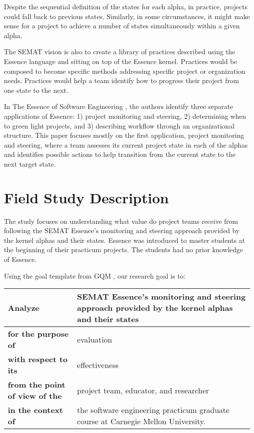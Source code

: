 Despite the sequential definition of the states for each alpha, in practice, projects could fall back to previous states. Similarly, in some circumstances, it might make sense for a project to achieve a number of states simultaneously within a given alpha.

The SEMAT vision is also to create a library of practices described using the Essence language and sitting on top of the Essence kernel. Practices would be composed to become specific methods addressing specific project or organization needs. Practices would help a team identify how to progress their project from one state to the next.

In The Essence of Software Engineering \cite{EssenceBook}, the authors identify three separate applications of Essence: 1) project monitoring and steering, 2) determining when to green light projects, and 3) describing workflow through an organizational structure. This paper focuses mostly on the first application, project monitoring and steering, where a team assesses its current project state in each of the alphas and identifies possible actions to help transition from the current state to the next target state.

\section{Field Study Description}
\label{Field Study Description}

The study focuses on understanding what value do project teams receive from following the SEMAT Essence's monitoring and steering approach provided by the kernel alphas and their states. Essence was introduced to master students at the beginning of their practicum projects. The students had no prior knowledge of Essence.

Using the goal template from GQM \cite{GQM}, our research goal is to:

\begin{table}[h]
\renewcommand{\arraystretch}{1.3}
\centering
\begin{tabular}{|p{1.20in}|p{1.90in}|}
\hline
\textbf{Analyze} & SEMAT Essence's monitoring and steering approach provided by the kernel alphas and their states \\ \hline
\textbf{for the purpose of} & evaluation \\ \hline
\textbf{with respect to its} & effectiveness \\ \hline
\textbf{from the point of view of the} & project team, educator, and researcher \\ \hline
\textbf{in the context of} & the software engineering practicum graduate course at Carnegie Mellon University. \\
\hline
\end{tabular}
\end{table}
 
